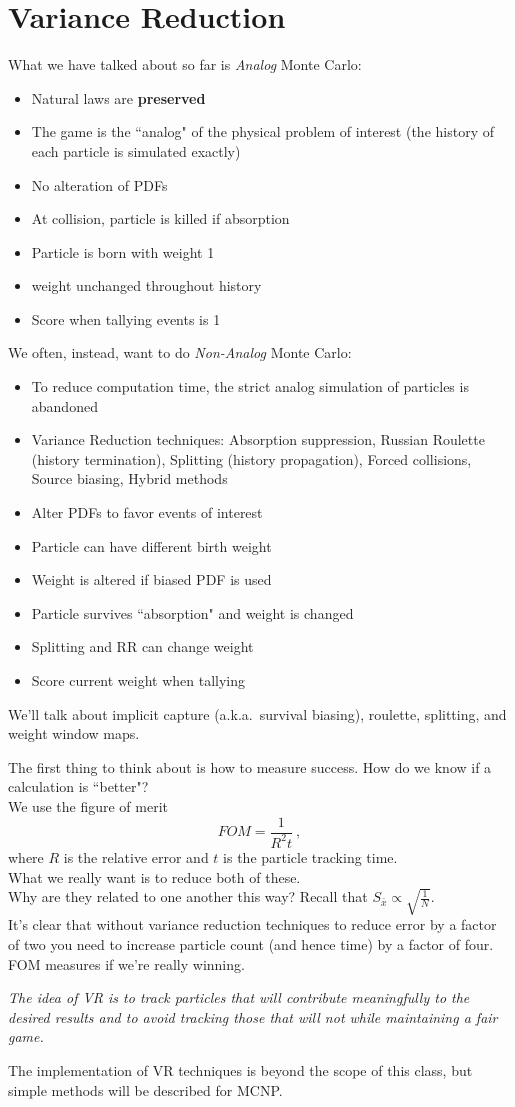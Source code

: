 \documentclass[12pt]{article}
\begin{document}
\section*{Variance Reduction}
What we have talked about so far is \textit{Analog} Monte Carlo:
\begin{itemize}
    \item Natural laws are \textbf{preserved}
    \item The game is the ``analog" of the physical problem of interest (the history of each particle is simulated exactly)
    \item No alteration of PDFs
    \item At collision, particle is killed if absorption
    \item Particle is born with weight 1
    \item weight unchanged throughout history
    \item Score when tallying events is 1
\end{itemize}
%
We often, instead, want to do \textit{Non-Analog} Monte Carlo:
\begin{itemize}
    \item To reduce computation time, the strict analog simulation of particles is abandoned
    \item Variance Reduction techniques: Absorption suppression, Russian Roulette (history termination), Splitting (history propagation), Forced collisions, Source biasing, Hybrid methods
    \item Alter PDFs to favor events of interest
    \item Particle can have different birth weight
    \item Weight is altered if biased PDF is used
    \item Particle survives ``absorption" and weight is changed
    \item Splitting and RR can change weight
    \item Score current weight when tallying
\end{itemize}
%
We'll talk about implicit capture (a.k.a.\ survival biasing), roulette, splitting, and weight window maps. 

The first thing to think about is how to measure success. How do we know if a calculation is ``better"?\\
We use the figure of merit
\[
FOM =\frac{1}{R^2 t}\:,
\]
where $R$ is the relative error and $t$ is the particle tracking time.\\
What we really want is to reduce both of these. \\
Why are they related to one another this way? Recall that $S_{\bar{x}} \propto \sqrt{\frac{1}{N}}$.\\
It's clear that without variance reduction techniques to reduce error by a factor of two you need to increase particle count (and hence time) by a factor of four.\\
FOM measures if we're really winning.

\textit{The idea of VR is to track particles that will contribute meaningfully to the desired results and to avoid tracking those that will not while maintaining a fair game.}

The implementation of VR techniques is beyond the scope of this class, but simple methods will be described for MCNP.
\end{document}
